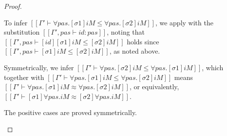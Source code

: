 \begin{proof}
\begin{caseof}
      To infer
      $[[Γ' ⊢ ∀pas.[σ1]iM ≤ ∀pas.[σ2]iM]]$,
      we apply 
      with the substitution $[[Γ', pas ⊢ id :{pas}]]$, 
      noting that $[[Γ', pas ⊢ [id][σ1]iM ≤ [σ2]iM ]]$
      holds since $[[Γ', pas ⊢ [σ1]iM ≤ [σ2]iM ]]$, 
      as noted above. 

      Symmetrically, we infer
      $[[Γ' ⊢ ∀pas.[σ2]iM ≤ ∀pas.[σ1]iM]]$,
      which together with
      $[[Γ' ⊢ ∀pas.[σ1]iM ≤ ∀pas.[σ2]iM]]$
      means
      $[[Γ' ⊢ ∀pas.[σ1]iM ≈ ∀pas.[σ2]iM]]$,
      or equivalently, 
      $[[Γ' ⊢ [σ1]∀pas.iM ≈ [σ2]∀pas.iM]]$.

    \item The positive cases are proved symmetrically.
  \end{caseof}
\end{proof}


